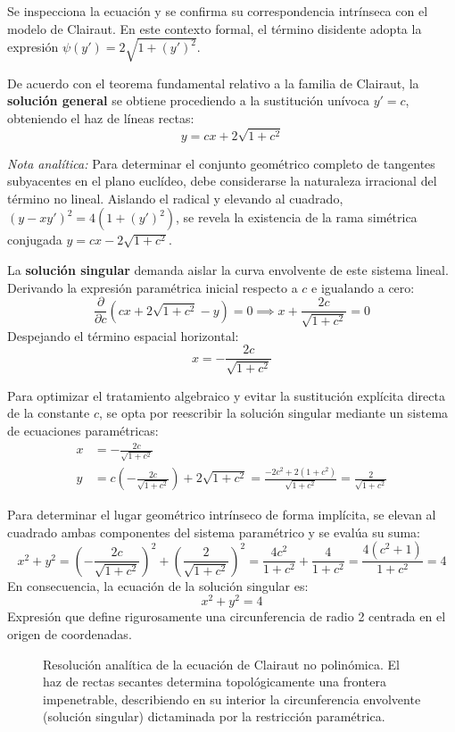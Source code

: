 \begin{tcolorbox}
Se inspecciona la ecuación y se confirma su correspondencia intrínseca con el modelo de Clairaut. En este contexto formal, el término disidente adopta la expresión $\psi(y') = 2\sqrt{1 + (y')^2}$.

De acuerdo con el teorema fundamental relativo a la familia de Clairaut, la \textbf{solución general} se obtiene procediendo a la sustitución unívoca $y' = c$, obteniendo el haz de líneas rectas:
$$ y = cx + 2\sqrt{1 + c^2} $$

\textit{Nota analítica:} Para determinar el conjunto geométrico completo de tangentes subyacentes en el plano euclídeo, debe considerarse la naturaleza irracional del término no lineal. Aislando el radical y elevando al cuadrado, $(y - xy')^2 = 4(1 + (y')^2)$, se revela la existencia de la rama simétrica conjugada $y = cx - 2\sqrt{1+c^2}$.

La \textbf{solución singular} demanda aislar la curva envolvente de este sistema lineal. Derivando la expresión paramétrica inicial respecto a $c$ e igualando a cero:
$$ \frac{\partial}{\partial c} \left( cx + 2\sqrt{1 + c^2} - y \right) = 0 \implies x + \frac{2c}{\sqrt{1 + c^2}} = 0 $$
Despejando el término espacial horizontal:
$$ x = -\frac{2c}{\sqrt{1 + c^2}} $$

Para optimizar el tratamiento algebraico y evitar la sustitución explícita directa de la constante $c$, se opta por reescribir la solución singular mediante un sistema de ecuaciones paramétricas:
\begin{align*}
    x &= -\frac{2c}{\sqrt{1 + c^2}} \\
    y &= c\left( -\frac{2c}{\sqrt{1 + c^2}} \right) + 2\sqrt{1 + c^2} = \frac{-2c^2 + 2(1 + c^2)}{\sqrt{1 + c^2}} = \frac{2}{\sqrt{1 + c^2}}
\end{align*}

Para determinar el lugar geométrico intrínseco de forma implícita, se elevan al cuadrado ambas componentes del sistema paramétrico y se evalúa su suma:
$$ x^2 + y^2 = \left( -\frac{2c}{\sqrt{1 + c^2}} \right)^2 + \left( \frac{2}{\sqrt{1 + c^2}} \right)^2 = \frac{4c^2}{1 + c^2} + \frac{4}{1 + c^2} = \frac{4(c^2 + 1)}{1 + c^2} = 4 $$
En consecuencia, la ecuación de la solución singular es:
$$ x^2 + y^2 = 4 $$
Expresión que define rigurosamente una circunferencia de radio 2 centrada en el origen de coordenadas.

\begin{figure}[H]
    \centering
    
    \caption{Resolución analítica de la ecuación de Clairaut no polinómica. El haz de rectas secantes determina topológicamente una frontera impenetrable, describiendo en su interior la circunferencia envolvente (solución singular) dictaminada por la restricción paramétrica.}
\end{figure}
\end{tcolorbox}
